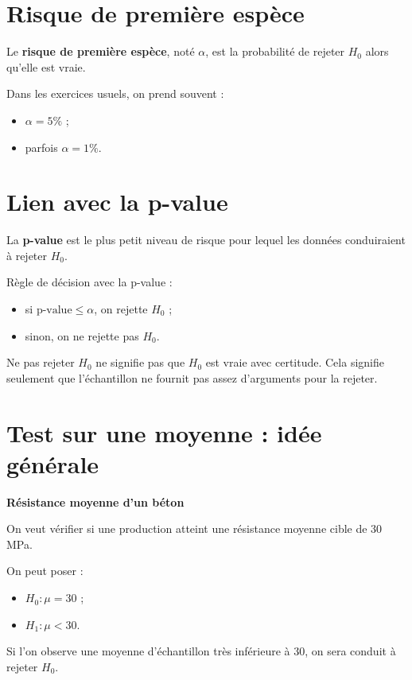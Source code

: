 \section{Risque de première espèce}

\begin{Def}
Le \textbf{risque de première espèce}, noté $\alpha$, est la probabilité de rejeter $H_0$ alors qu'elle est vraie.
\end{Def}

\begin{Rmq}
Dans les exercices usuels, on prend souvent :
\begin{itemize}
    \item $\alpha = 5\%$ ;
    \item parfois $\alpha = 1\%$.
\end{itemize}
\end{Rmq}

\section{Lien avec la p-value}

\begin{Def}
La \textbf{p-value} est le plus petit niveau de risque pour lequel les données conduiraient à rejeter $H_0$.
\end{Def}

\begin{Meth}
Règle de décision avec la p-value :
\begin{itemize}
    \item si $\text{p-value} \leq \alpha$, on rejette $H_0$ ;
    \item sinon, on ne rejette pas $H_0$.
\end{itemize}
\end{Meth}

\begin{Rmq}
Ne pas rejeter $H_0$ ne signifie pas que $H_0$ est vraie avec certitude. Cela signifie seulement que l'échantillon ne fournit pas assez d'arguments pour la rejeter.
\end{Rmq}

\section{Test sur une moyenne : idée générale}

\begin{Ex}
\textbf{Résistance moyenne d'un béton}

On veut vérifier si une production atteint une résistance moyenne cible de $30$ MPa.

On peut poser :
\begin{itemize}
    \item $H_0 : \mu = 30$ ;
    \item $H_1 : \mu < 30$.
\end{itemize}

Si l'on observe une moyenne d'échantillon très inférieure à $30$, on sera conduit à rejeter $H_0$.
\end{Ex}

